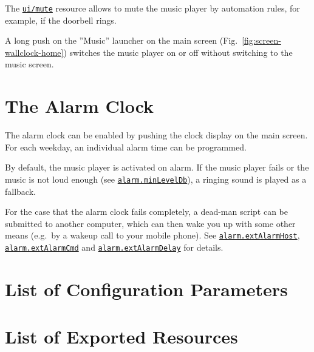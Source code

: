 \documentclass[12pt,english,parskip=half]{scrreprt}
\newcommand{\idx}[1]{#1\index{#1}}
\newcommand{\envref}[1]{\hyperref[env:#1]{\texttt{#1}}}        %
\newcommand{\rcref}[1]{\hyperref[rc:#1]{\texttt{#1}}}
\begin{document}
The \rcref{ui/mute} resource allows to mute the music player by automation 
rules, for example, if the doorbell rings.

A long push on the ''Music'' launcher on the main screen (Fig.~\ref{fig:screen-wallclock-home}) 
switches the music player on or off without switching to the music screen.





\section{The Alarm Clock}
\label{sec:wallclock-alarmclock}

The alarm clock can be enabled by pushing the clock display on the main screen.
For each weekday, an individual alarm time can be programmed.

By default, the music player is activated on alarm. If the music player fails
or the music is not loud enough (see \envref{alarm.minLevelDb}), a ringing 
sound is played as a fallback.

For the case that the alarm clock fails completely, a dead-man script can 
be submitted to another computer, which can then wake you up with some 
other means (e.g.~by a wakeup call to your mobile phone). 
See \envref{alarm.extAlarmHost}, \envref{alarm.extAlarmCmd} and \envref{alarm.extAlarmDelay}
for details.





\section{List of Configuration Parameters}
\label{sec:wallclock-env}




\section{List of Exported Resources}
\label{sec:wallclock-rc}
\end{document}
